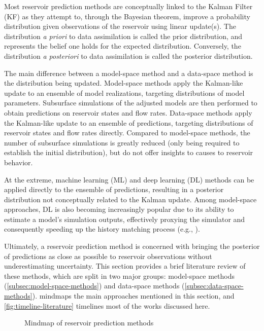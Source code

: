Most reservoir prediction methods are conceptually linked to the Kalman Filter (KF)
\cite{Kalman:1960} 
as they attempt to, through the Bayesian theorem, improve a probability distribution given observations of the reservoir
using linear update(s). 
%
The distribution \emph{a priori} to data assimilation is called the prior distribution,
and represents the belief one holds for the expected distribution.
Conversely, the distribution \emph{a posteriori} to data assimilation is called the posterior distribution.

The main difference between a model-space method and a data-space method is the distribution being updated.
Model-space methods apply the Kalman-like update to an ensemble of model realizations, targeting distributions of model parameters.
Subsurface simulations of the adjusted models are then performed to obtain predictions on reservoir states and flow rates.
% 
Data-space methods apply the Kalman-like update to an ensemble of predictions, targeting distributions of reservoir states and flow rates directly.
Compared to model-space methods, the number of subsurface simulations is greatly reduced (only being required to establish the initial distribution),
but do not offer insights to causes to reservoir behavior.

At the extreme, machine learning (ML) and deep learning (DL) methods can be applied directly to the ensemble of predictions,
resulting in a posterior distribution not conceptually related to the Kalman update.
%
Among model-space approaches, DL is also becoming increasingly popular due to its ability to estimate a model's simulation outputs,
effectively proxying the simulator and consequently speeding up the history matching process
(e.g., ).

Ultimately, a reservoir prediction method is concerned with bringing the posterior of predictions 
as close as possible to reservoir observations without underestimating uncertainty.
%
This section provides a brief literature review of these methods, which are split in two major groups:
model-space methods (\cref{subsec:model-space-methods}) and 
data-space methods (\cref{subsec:data-space-methods}).
 mindmaps the main approaches mentioned in this section, and
\cref{fig:timeline-literature} timelines most of the works discussed here.

\begin{figure}[htbp]
    \centering
    \caption{Mindmap of reservoir prediction methods}
    \label{fig:graph-literature}
    \scalebox{0.9}{%
        
    }
\end{figure}

